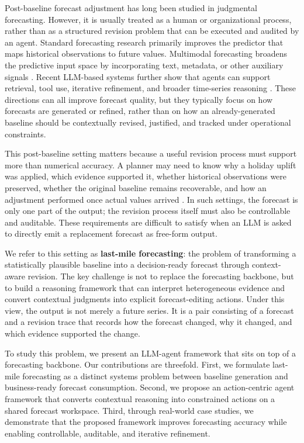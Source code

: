 \documentclass{article}
\theoremstyle{plain}
\theoremstyle{definition}
\theoremstyle{remark}
\begin{document}
Post-baseline forecast adjustment has long been studied in judgmental forecasting. However, it is usually treated as a human or organizational process, rather than as a structured revision problem that can be executed and audited by an agent. Standard forecasting research primarily improves the predictor that maps historical observations to future values. Multimodal forecasting broadens the predictive input space by incorporating text, metadata, or other auxiliary signals \cite{kim2024multi,jiang2025multi}. Recent LLM-based systems further show that agents can support retrieval, tool use, iterative refinement, and broader time-series reasoning \cite{citation-0,yeh2025empowering,jalori-etal-2025-flairr,zhao2025timeseriesscientist}. These directions can all improve forecast quality, but they typically focus on how forecasts are generated or refined, rather than on how an already-generated baseline should be contextually revised, justified, and tracked under operational constraints.

This post-baseline setting matters because a useful revision process must support more than numerical accuracy. A planner may need to know why a holiday uplift was applied, which evidence supported it, whether historical observations were preserved, whether the original baseline remains recoverable, and how an adjustment performed once actual values arrived \cite{fildes2009effective}. In such settings, the forecast is only one part of the output; the revision process itself must also be controllable and auditable. These requirements are difficult to satisfy when an LLM is asked to directly emit a replacement forecast as free-form output.

We refer to this setting as \textbf{last-mile forecasting}: the problem of transforming a statistically plausible baseline into a decision-ready forecast through context-aware revision. The key challenge is not to replace the forecasting backbone, but to build a reasoning framework that can interpret heterogeneous evidence and convert contextual judgments into explicit forecast-editing actions. Under this view, the output is not merely a future series. It is a pair consisting of a forecast and a revision trace that records how the forecast changed, why it changed, and which evidence supported the change.

To study this problem, we present an LLM-agent framework that sits on top of a forecasting backbone. Our contributions are threefold. First, we formulate last-mile forecasting as a distinct systems problem between baseline generation and business-ready forecast consumption. Second, we propose an action-centric agent framework that converts contextual reasoning into constrained actions on a shared forecast workspace. Third, through real-world case studies, we demonstrate that the proposed framework improves forecasting accuracy while enabling controllable, auditable, and iterative refinement.
\end{document}
